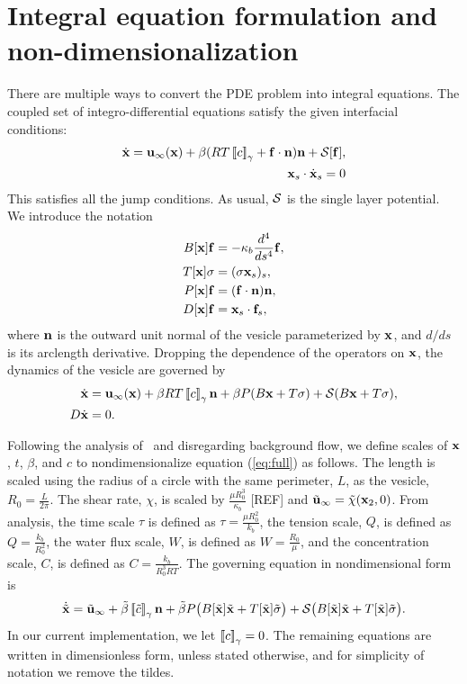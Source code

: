 \documentclass[twoside,twocolumn,9pt]{article}
\begin{document}
\section{Integral equation formulation and non-dimensionalization}
There are multiple ways to convert the PDE problem into integral
equations. The coupled set of
integro-differential equations satisfy the given interfacial conditions:
\begin{align}
  \label{eqn:vesVelocity}
  \dot{\mathbf{x}} = \mathbf{u}_\infty(\mathbf{x}) + \beta
  (RT\left[\!\left[ c \right]\!\right]_\gamma+\mathbf{f}\cdot\mathbf{n})\mathbf{n}
  + \mathcal{S} [\mathbf{f}], & \\
  \mathbf{x}_s\cdot\dot{\mathbf{x}}_s = 0 &
\end{align}
This satisfies all the jump conditions. As usual, $\mathcal{S}$ is the single
layer potential.  We introduce the notation
\begin{align}
  B[\mathbf{x}]\mathbf{f} &= -\kappa_b\frac{d^4}{ds^4} \mathbf{f}, \\
  T[\mathbf{x}]\sigma &= (\sigma \mathbf{x}_s)_s, \\
  P[\mathbf{x}]\mathbf{f} &= (\mathbf{f} \cdot \mathbf{n}) \mathbf{n}, \\
  D[\mathbf{x}]\mathbf{f} &= \mathbf{x}_s \cdot \mathbf{f}_s,
\end{align}
where $\mathbf{n}$ is the outward unit normal of the vesicle parameterized by
$\mathbf{x}$, and $d/ds$ is its arclength derivative.  Dropping the dependence
of the operators on $\mathbf{x}$, the dynamics of the vesicle are governed by
\begin{align}
  \dot{\mathbf{x}} &= \mathbf{u}_{\infty}(\mathbf{x}) + 
  \beta RT\left[\!\left[ c \right]\!\right]_\gamma\mathbf{n} + \beta P(B\mathbf{x} + T\sigma) + \mathcal{S}(B\mathbf{x} + T\sigma), \label{eq:full}\\
  D \dot{\mathbf{x}} &= 0.
\end{align}

Following the analysis of~\cite{vee-gue-zor-bir2009} and
disregarding background flow, we define scales of $\mathbf{x}$, $t$, $\beta$,
and $c$ to nondimensionalize equation (\ref{eq:full}) as follows. The length is scaled using the radius of a circle with the same perimeter,
$L$, as the vesicle, $R_0 = \frac{L}{2\pi}$. The shear rate, $\chi$, is scaled by $\frac{\mu R_0^3}{\kappa_b}$ [REF] and $\Tilde{\mathbf{u}}_{\infty} = \Tilde{\chi}(\mathbf{x}_2,0)$. From analysis, the time
scale $\tau$ is defined as $\tau = \frac{\mu R_0^2}{k_b}$, the tension
scale, $Q$, is defined as $Q = \frac{k_b}{R_0^2}$, the water flux scale,
$W$, is defined as $W=\frac{R_0}{\mu}$, and the concentration scale,
$C$, is defined as $C=\frac{k_b}{R_0^3RT}$. The governing equation in
nondimensional form is
\begin{align}
    \dot{\Tilde{\mathbf{x}}} = \Tilde{\mathbf{u}}_{\infty} + \Tilde{\beta}\left[\!\left[ \tilde{c} \right]\!\right]_\gamma\mathbf{n} +
    \Tilde{\beta}P\big(B[\Tilde{\mathbf{x}}]\Tilde{\mathbf{x}}+T[\Tilde{\mathbf{x}}]\Tilde{\sigma}\big)
    +\mathcal{S}\big( B[\Tilde{\mathbf{x}}]\Tilde{\mathbf{x}} + T[\Tilde{\mathbf{x}}]\Tilde{\sigma}\big).
\end{align}
In our current implementation, we let $\left[\!\left[ c \right]\!\right]_\gamma = 0$. The remaining equations are written in dimensionless form, unless stated otherwise, and for simplicity of notation we remove the tildes.
\end{document}
